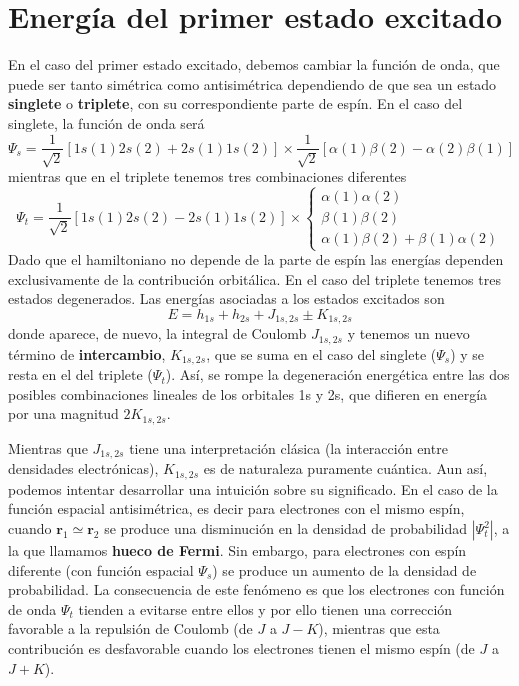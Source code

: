 \documentclass{tufte-handout}
\begin{document}
\section{Energía del primer estado excitado}
En el caso del primer estado excitado, debemos cambiar la función 
de onda, que puede ser tanto simétrica como antisimétrica 
dependiendo de que sea un estado \textbf{singlete} o 
\textbf{triplete}, con su correspondiente parte de espín. 
En el caso del singlete, la función de onda será
\begin{equation}
    \Psi_s=\frac{1}{\sqrt{2}}[1s(1)2s(2)+2s(1)1s(2)]\times
    \frac{1}{\sqrt{2}}[\alpha(1)\beta(2)-\alpha(2)\beta(1)]
\end{equation}
mientras que en el triplete tenemos tres combinaciones diferentes
\begin{equation}
\Psi_t=\frac{1}{\sqrt{2}}[1s(1)2s(2)-2s(1)1s(2)]\times
\begin{cases}
\alpha(1)\alpha(2)\\
\beta(1)\beta(2) \\
\alpha(1)\beta(2) + \beta(1)\alpha(2)
\end{cases}
\end{equation}
Dado que el hamiltoniano no depende de la parte de espín
las energías dependen exclusivamente de la contribución
orbitálica. En el caso del triplete tenemos tres estados 
degenerados. Las energías asociadas a los estados excitados
son 
\begin{equation}
    E=h_{1s} + h_{2s} +J_{1s,2s} \pm K_{1s,2s}
\end{equation}
donde aparece, de nuevo, la integral de Coulomb $J_{1s,2s}$
y tenemos un nuevo término de \textbf{intercambio}, $K_{1s,2s}$, que se
suma en el caso del singlete ($\Psi_s$) y se resta en el del triplete ($\Psi_t$). Así, se rompe la degeneración energética
entre las dos posibles combinaciones lineales de los orbitales
1s y 2s, que difieren en energía por una magnitud $2K_{1s,2s}$.

Mientras que $J_{1s,2s}$ tiene una interpretación clásica
(la interacción entre densidades electrónicas), 
$K_{1s,2s}$ es de naturaleza puramente cuántica. Aun así, 
podemos intentar desarrollar una intuición sobre su significado. En el caso de la función espacial antisimétrica,
es decir para electrones con el mismo espín, 
cuando $\mathbf{r}_1\simeq\mathbf{r}_2$ se produce una
disminución en la densidad de probabilidad $|\Psi_t^2|$,
a la que llamamos \textbf{hueco de Fermi}. Sin embargo,
para electrones con espín diferente (con función espacial $\Psi_s$) se produce un aumento de la densidad de probabilidad.
La consecuencia de este fenómeno es que los electrones con 
función de onda $\Psi_t$ tienden a evitarse entre ellos y
por ello tienen una corrección favorable a la repulsión de Coulomb (de $J$ a $J-K$), mientras que esta contribución es desfavorable cuando los electrones tienen el mismo 
espín (de $J$ a $J+K$).
 
\end{document}
